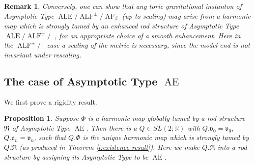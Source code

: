 \documentclass[a4paper,11pt]{amsart}
\newtheorem{proposition}[theorem]{Proposition}
\newtheorem{remark}[theorem]{Remark}
\theoremstyle{definition}
\numberwithin{equation}{section}
\newcommand{\R}{\mathbb{R}}
\newcommand{\mv} {\mathfrak v}
\newcommand{\mR} {\mathfrak R}
\DeclareMathOperator{\Ae}{AE}
\DeclareMathOperator{\ALF}{ALF}
\DeclareMathOperator{\ALE}{ALE}
\DeclareMathOperator{\AF}{AF}
\DeclareMathOperator{\AFa}{AF_\beta}
\begin{document}
\begin{remark}Conversely, one can show that any toric gravitational instanton of Asymptotic Type  $\ALE/\ALF^{\pm}/\AF_\beta$ (up to scaling) may arise from a harmonic map which is strongly tamed by an enhanced rod structure of Asymptotic Type $\ALE/\ALF^{\pm}/\AFa$, for an appropriate choice of a smooth enhancement. Here in the $\ALF^{\pm}/\AFa$ case a scaling of the metric is necessary, since the model end is not invariant under rescaling. 
\end{remark}










\subsection{The case of Asymptotic Type  \texorpdfstring{$\Ae$}{}} \label{ss: Type AE case}
We first prove a rigidity result.
\begin{proposition} \label{p:AE rigidity}
    Suppose $\Phi$ is a harmonic map globally tamed by a rod structure $\mR$ of  Asymptotic Type  $\Ae$. Then there is a $Q\in SL(2; \R)$ with $Q.\mv_0=\mv_0$, $Q.\mv_n=\mv_n$, such that  $Q.\Phi$ is the unique harmonic map which is strongly tamed by $Q.\mR$ (as produced in Theorem \ref{t:existence result}). Here we make $Q.\mR$ into a rod structure by assigning its Asymptotic Type to be $\Ae$.
\end{proposition}
\end{document}
